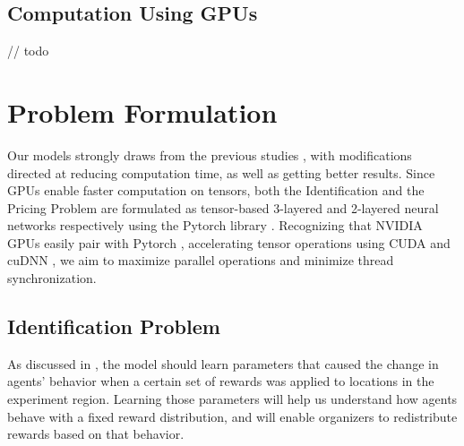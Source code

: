 \documentclass[12pt]{article}
\begin{document}
    \subsection{Computation Using GPUs} \label{sec:Computation Using GPUs}
    // todo
    
    \section{Problem Formulation} \label{sec:Problem Formulation}
    Our models strongly draws from the previous studies \cite{Xue2016Avi1, Xue2016Avi2}, with modifications directed at reducing computation time, as well as getting better results. Since GPUs enable faster computation on tensors, both the Identification and the Pricing Problem are formulated as tensor-based 3-layered and 2-layered neural networks respectively using the Pytorch library \cite{PTDocs}. Recognizing that NVIDIA GPUs easily pair with Pytorch \cite{PTDocs}, accelerating tensor operations using CUDA and cuDNN \cite{cuDNNPaper, NVIDIA}, we aim to maximize parallel operations and minimize thread synchronization.
    
    \subsection{Identification Problem} \label{sec:Identification Problem}
    As discussed in , the model should learn parameters that caused the change in agents' behavior when a certain set of rewards was applied to locations in the experiment region. Learning those parameters will help us understand how agents behave with a fixed reward distribution, and will enable organizers to redistribute rewards based on that behavior.
    
\end{document}
